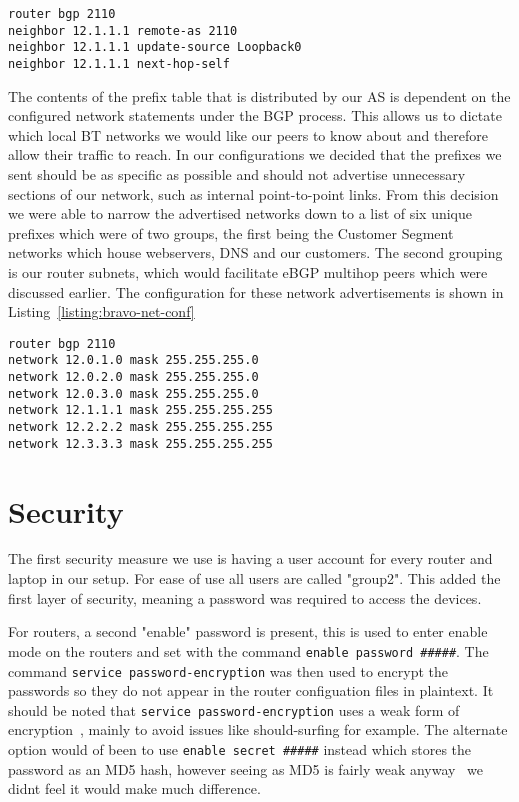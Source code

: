 \begin{lstlisting}[caption={Bravo-Alpha iBGP Configuration}, label={listing:bravo-ibgp-conf}]
router bgp 2110
neighbor 12.1.1.1 remote-as 2110
neighbor 12.1.1.1 update-source Loopback0
neighbor 12.1.1.1 next-hop-self
\end{lstlisting}

The contents of the prefix table that is distributed by our AS is dependent on
the configured network statements under the BGP process. This allows us to
dictate which local BT networks we would like our peers to know about and
therefore allow their traffic to reach. In our configurations we decided that
the prefixes we sent should be as specific as possible and should not advertise
unnecessary sections of our network, such as internal point-to-point links. From
this decision we were able to narrow the advertised networks down to a list of
six unique prefixes which were of two groups, the first being the Customer
Segment networks which house webservers, DNS and our customers. The second
grouping is our router subnets, which would facilitate eBGP multihop peers which
were discussed earlier. The configuration for these network advertisements is
shown in Listing~\ref{listing:bravo-net-conf}

\begin{lstlisting}[caption={Bravo BGP Network Configuration}, label={listing:bravo-net-conf}]
router bgp 2110
network 12.0.1.0 mask 255.255.255.0
network 12.0.2.0 mask 255.255.255.0
network 12.0.3.0 mask 255.255.255.0
network 12.1.1.1 mask 255.255.255.255
network 12.2.2.2 mask 255.255.255.255
network 12.3.3.3 mask 255.255.255.255
\end{lstlisting}

\section{Security}
The first security measure we use is having a user account for every router and
laptop in our setup. For ease of use all users are called "group2". This added
the first layer of security,  meaning a password was required to access the
devices.

For routers, a second "enable" password is present, this is used to enter
enable mode on the routers and set with the command \texttt{enable password
\#\#\#\#\#}. The command \texttt{service password-encryption} was then used to
encrypt the passwords so they do not appear in the router configuation files in
plaintext. It should be noted that \texttt{service password-encryption} uses a
weak form of encryption~\cite{ciscocracker}, mainly to avoid issues like
should-surfing for example. The alternate option would of been to use
\texttt{enable secret \#\#\#\#\#} instead which stores the password as an MD5
hash, however seeing as MD5 is fairly weak anyway~\cite{md5} we didnt feel it
would make much difference.

